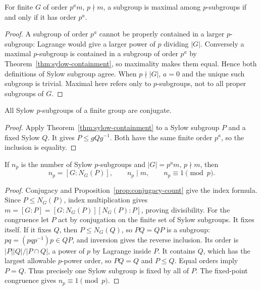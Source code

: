 \begin{proposition}\label{prop:sylow-definition}
For finite $G$ of order $p^am$, $p\nmid m$, a subgroup is maximal among $p$-subgroups if and only if it has order $p^a$.
\end{proposition}
\begin{proof}
A subgroup of order $p^a$ cannot be properly contained in a larger $p$-subgroup: Lagrange would give a larger power of $p$ dividing $|G|$. Conversely a maximal $p$-subgroup is contained in a subgroup of order $p^a$ by Theorem~\ref{thm:sylow-containment}, so maximality makes them equal. Hence both definitions of Sylow subgroup agree. When $p\nmid|G|$, $a=0$ and the unique such subgroup is trivial. Maximal here refers only to $p$-subgroups, not to all proper subgroups of $G$.
\end{proof}

\begin{theorem}\label{thm:sylow-conjugacy}
All Sylow $p$-subgroups of a finite group are conjugate.
\end{theorem}
\begin{proof}
Apply Theorem~\ref{thm:sylow-containment} to a Sylow subgroup $P$ and a fixed Sylow $Q$. It gives $P\leq gQg^{-1}$. Both have the same finite order $p^a$, so the inclusion is equality.
\end{proof}

\begin{theorem}\label{thm:sylow-counting}
If $n_p$ is the number of Sylow $p$-subgroups and $|G|=p^am$, $p\nmid m$, then
\[
 n_p=[G:N_G(P)],\qquad n_p\mid m,\qquad n_p\equiv1\pmod p.
\]
\end{theorem}
\begin{proof}
Conjugacy and Proposition~\ref{prop:conjugacy-count} give the index formula. Since $P\leq N_G(P)$, index multiplication gives
$m=[G:P]=[G:N_G(P)][N_G(P):P]$, proving divisibility. For the congruence let $P$ act by conjugation on the finite set of Sylow subgroups. It fixes itself. If it fixes $Q$, then $P\leq N_G(Q)$, so $PQ=QP$ is a subgroup: $pq=(pqp^{-1})p\in QP$, and inversion gives the reverse inclusion. Its order is $|P||Q|/|P\cap Q|$, a power of $p$ by Lagrange inside $P$. It contains $Q$, which has the largest allowable $p$-power order, so $PQ=Q$ and $P\leq Q$. Equal orders imply $P=Q$. Thus precisely one Sylow subgroup is fixed by all of $P$. The fixed-point congruence gives $n_p\equiv1\pmod p$.
\end{proof}

